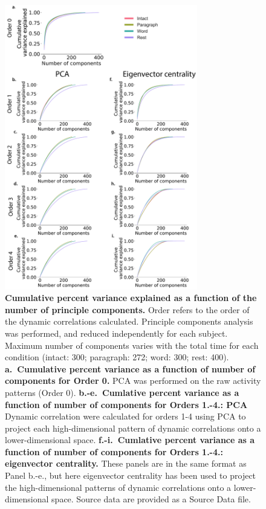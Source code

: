 \documentclass[english]{article}
\begin{document}
\begin{figure}[p!]
\centering
\includegraphics[width=0.75\textwidth]{figs/pca}
\caption{\textbf{Cumulative percent variance explained as a function
    of the number of principle components.}  Order refers to the order of the dynamic
    correlations calculated. Principle components analysis was
    performed, and reduced independently for each subject.  Maximum number of components varies with
    the total time for each condition (intact: 300; paragraph: 272;
    word: 300; rest: 400). \textbf{a.~Cumulative percent
    variance as a function of number of components for Order 0.} PCA
  was performed on the raw activity patterns (Order 0). \textbf{b.-e.~Cumlative percent
    variance as a function of number of components for Orders 1.-4.:
    PCA} Dynamic correlation were calculated for orders 1-4 using PCA to
    project each high-dimensional pattern of dynamic correlations onto
    a lower-dimensional space.   \textbf{f.-i.~Cumlative percent
    variance as a function of number of components for Orders 1.-4.: eigenvector centrality.} These panels are in the
    same format as Panel b.-e., but here eigenvector centrality has been
    used to project the high-dimensional patterns of dynamic
    correlations onto a lower-dimensional space. Source data are provided as a Source Data file.}
\label{fig:pca}
\end{figure}





\newpage
\renewcommand{\refname}{Supplementary references}


\end{document}
